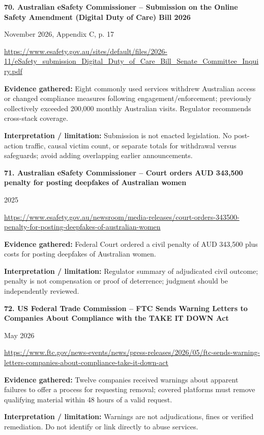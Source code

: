 \documentclass[11pt,a4paper]{article}
\begin{document}
\noindent\begin{minipage}{\linewidth}\textbf{70. Australian eSafety Commissioner -- Submission on the Online Safety Amendment (Digital Duty of Care) Bill 2026}\par{\small November 2026, Appendix C, p. 17\par\url{https://www.esafety.gov.au/sites/default/files/2026-11/eSafety_submission_Digital_Duty_of_Care_Bill_Senate_Committee_Inquiry.pdf}}\par
\textbf{Evidence gathered:} Eight commonly used services withdrew Australian access or changed compliance measures following engagement/enforcement; previously collectively exceeded 200,000 monthly Australian visits. Regulator recommends cross-stack coverage.\par\textbf{Interpretation / limitation:} Submission is not enacted legislation. No post-action traffic, causal victim count, or separate totals for withdrawal versus safeguards; avoid adding overlapping earlier announcements.\par\end{minipage}\par\vspace{2mm}
\noindent\begin{minipage}{\linewidth}\textbf{71. Australian eSafety Commissioner -- Court orders AUD 343,500 penalty for posting deepfakes of Australian women}\par{\small 2025\par\url{https://www.esafety.gov.au/newsroom/media-releases/court-orders-343500-penalty-for-posting-deepfakes-of-australian-women}}\par
\textbf{Evidence gathered:} Federal Court ordered a civil penalty of AUD 343,500 plus costs for posting deepfakes of Australian women.\par\textbf{Interpretation / limitation:} Regulator summary of adjudicated civil outcome; penalty is not compensation or proof of deterrence; judgment should be independently reviewed.\par\end{minipage}\par\vspace{2mm}
\noindent\begin{minipage}{\linewidth}\textbf{72. US Federal Trade Commission -- FTC Sends Warning Letters to Companies About Compliance with the TAKE IT DOWN Act}\par{\small May 2026\par\url{https://www.ftc.gov/news-events/news/press-releases/2026/05/ftc-sends-warning-letters-companies-about-compliance-take-it-down-act}}\par
\textbf{Evidence gathered:} Twelve companies received warnings about apparent failures to offer a process for requesting removal; covered platforms must remove qualifying material within 48 hours of a valid request.\par\textbf{Interpretation / limitation:} Warnings are not adjudications, fines or verified remediation. Do not identify or link directly to abuse services.\par\end{minipage}\par\vspace{2mm}
\end{document}
